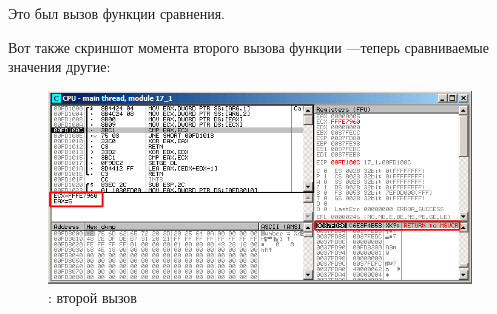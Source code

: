 Это был вызов функции сравнения.

\clearpage
Вот также скриншот момента второго вызова функции \comp{}---теперь сравниваемые значения другие:

\begin{figure}[H]
\centering
\includegraphics[scale=\FigScale]{patterns/18_pointers_to_functions/olly3.png}
\caption{\olly: второй вызов \comp}
\label{fig:qsort_olly3}
\end{figure}
